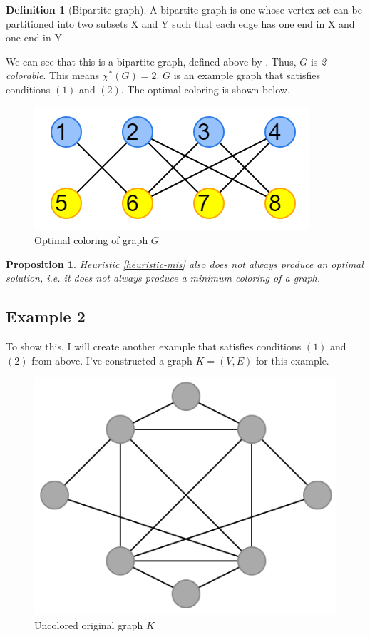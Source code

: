 \documentclass{article}
\newcounter{heuristic} \setcounter{heuristic}{0}
\newtheorem{prop}{Proposition}
\theoremstyle{definition}
\newtheorem{definition}{Definition}
\begin{document}
\begin{definition}[Bipartite graph]
A bipartite graph is one whose vertex set can be partitioned into two subsets X and Y such that each edge has one end in X and one end in Y
\end{definition}

We can see that this is a bipartite graph, defined above by \cite{bondymurty}. Thus, \(G\) is \emph{2-colorable}. This means \(\chi^{*}(G) = 2\). \(G\) is an example graph that satisfies conditions \((1)\) and \((2)\). The optimal coloring is shown below.

\begin{figure}[H]
\centering
\includegraphics[scale=0.6]{images/graph-3.png}
\caption{Optimal coloring of graph \(G\)}
\end{figure}

\begin{prop}
Heuristic \ref{heuristic-mis} also does not always produce an optimal solution, i.e. it does not always produce a minimum coloring of a graph.
\end{prop}

\subsection*{Example 2}
To show this, I will create another example that satisfies conditions \((1)\) and \((2)\) from above. I've constructed a graph \(K = (V,E)\) for this example.

\begin{figure}[H]
\centering
\includegraphics[scale=0.38]{images/mis-1.png}
\caption{Uncolored original graph \(K\)}
\end{figure}
\end{document}
